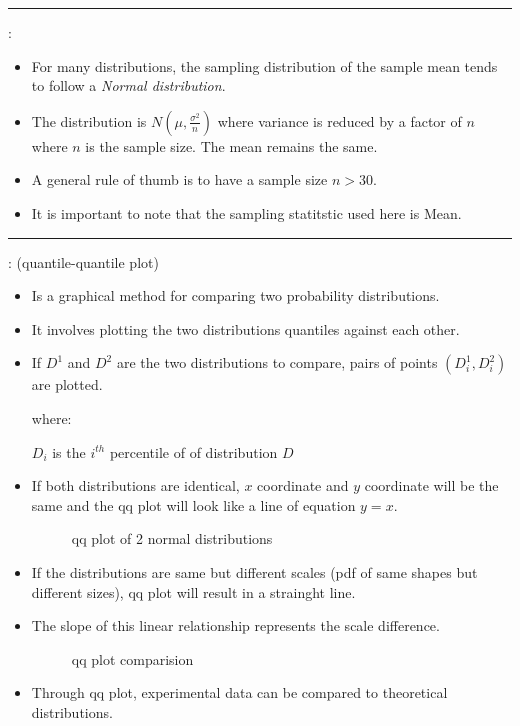 \documentclass[	DIV=calc,%
paper=a4,%
fontsize=11pt,%
twocolumn]{scrartcl} %
\newcommand{\hformbar}[1]{\vspace{5pt}\hrule\vspace{10pt}} %
\newcommand{\formdesc}[1]{\noindent\textbf{#1}}
\begin{document}
\hformbar

\formdesc{Central Limit theorem}:
\begin{itemize}
	\item For many distributions, the sampling distribution of the sample mean tends to follow a \emph{Normal distribution}.
	\item The distribution is $N (\mu,\frac{\sigma^2}{n})$ where variance is reduced by a factor of $n$ where $n$ is the sample size. The mean remains the same.
	\item A general rule of thumb is to have a sample size $n > 30$.
	\item It is important to note that the sampling statitstic used here is Mean.
\end{itemize}

\hformbar

\formdesc{Q-Q Plot}: (quantile-quantile  plot)
\begin{itemize}
	\item Is a graphical method for comparing two probability distributions.
	\item It involves plotting the two distributions quantiles against each other.
	\item If $D^1$ and $D^2$ are the two distributions to compare, pairs of points $(D_i^ 1,D_i^ 2)$ are plotted.
	
		where:
		
			$D_i$ is the $i^{th}$ percentile of of distribution $D$
	\item If both distributions are identical, $x$ coordinate and $y$ coordinate will be the same and the qq plot will look like a line of equation $y=x$.
	
	\begin{figure}[ht!]
		\centering
		\caption{qq plot of 2 normal distributions}
		\graphicspath{ {images/math/} }
		
	\end{figure}

	\item If the distributions are same but different scales (pdf of same shapes but different sizes), qq plot will result in a strainght line.
	\item The slope of this linear relationship represents the scale difference.
		\begin{figure}[ht!]
		\centering
		\caption{qq plot comparision}
		\graphicspath{ {images/math/} }
		
	\end{figure}

	\item Through qq plot, experimental data can be compared to theoretical distributions.
\end{itemize}
\end{document}
